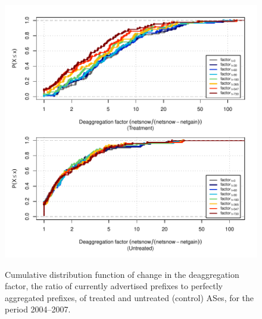 \begin{figure}[H]
\begin{centering}
\begin{singlespace}
    \includegraphics[width=6in]{figures/behavior-deagg_factor-2004_2007-corr.pdf}
    \vspace{-2em}\\
    \caption{Cumulative distribution function of change in the deaggregation factor, the ratio of currently advertised prefixes to perfectly aggregated prefixes, of treated and untreated (control) ASes, for the period 2004--2007.}
\end{singlespace}
\end{centering}
\end{figure}
